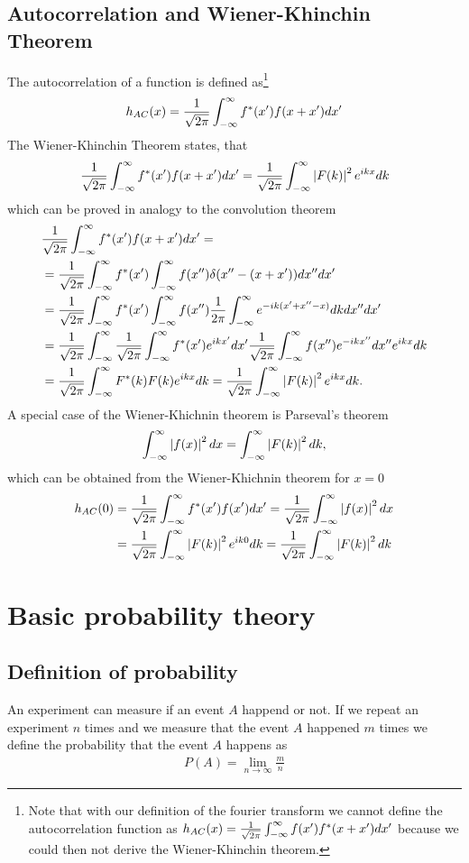 \subsection{Autocorrelation and Wiener-Khinchin Theorem}
The autocorrelation of a function is defined as\footnote{Note that
with our definition of the fourier transform we cannot define  
the autocorrelation function as $h_{AC}(x) = \frac{1}{\sqrt{2\pi}} \int_{-\infty}^{\infty} f(x') f^*(x+x') dx'$
because we could then not derive the Wiener-Khinchin theorem.}
\begin{align}
h_{AC}(x) = \frac{1}{\sqrt{2\pi}} \int_{-\infty}^{\infty} f^*(x') f(x+x') dx'
\end{align}
The Wiener-Khinchin Theorem states, that 
\begin{align}
\frac{1}{\sqrt{2\pi}} \int_{-\infty}^{\infty} f^*(x') f(x+x') dx' = \frac{1}{\sqrt{2\pi}} \int_{-\infty}^{\infty} \left\lvert F(k)\right\rvert^2 e^{ikx} dk
\end{align}
which can be proved in analogy to the convolution theorem
\begin{align*}
&\frac{1}{\sqrt{2\pi}} \int_{-\infty}^{\infty} f^*(x') f(x+x') dx' =\\
&=\frac{1}{\sqrt{2\pi}} \int_{-\infty}^{\infty} f^*(x') \int_{-\infty}^{\infty} f(x'') \delta(x''-(x+x')) dx'' dx'\\
&=\frac{1}{\sqrt{2\pi}} \int_{-\infty}^{\infty} f^*(x') \int_{-\infty}^{\infty} f(x'') \frac{1}{2\pi} \int_{-\infty}^{\infty} e^{-ik(x'+x''-x)} dk dx'' dx'\\
&=\frac{1}{\sqrt{2\pi}} \int_{-\infty}^{\infty} \frac{1}{\sqrt{2\pi}} \int_{-\infty}^{\infty} f^*(x') e^{ikx'} dx' \frac{1}{\sqrt{2\pi}} \int_{-\infty}^{\infty} f(x'') e^{-ikx''} dx''
e^{ikx} dk\\
&=\frac{1}{\sqrt{2\pi}} \int_{-\infty}^{\infty} F^*(k) F(k) e^{ikx} dk = \frac{1}{\sqrt{2\pi}} \int_{-\infty}^{\infty} \left\lvert F(k)\right\rvert^2 e^{ikx} dk.
\end{align*}
A special case of the Wiener-Khichnin theorem is Parseval's theorem
\begin{align}
\int_{-\infty}^{\infty} \left\lvert f(x)\right\rvert^2 dx = \int_{-\infty}^{\infty} \left\lvert F(k)\right\rvert^2 dk, 
\end{align}
which can be obtained from the Wiener-Khichnin theorem for $x=0$
\begin{align*}
h_{AC}(0)&= \frac{1}{\sqrt{2\pi}} \int_{-\infty}^{\infty} f^*(x') f(x') dx' = \frac{1}{\sqrt{2\pi}} \int_{-\infty}^{\infty} \left\lvert f(x)\right\rvert^2 dx \\
&= \frac{1}{\sqrt{2\pi}} \int_{-\infty}^{\infty} \left\lvert F(k)\right\rvert^2 e^{ik0} dk = \frac{1}{\sqrt{2\pi}} \int_{-\infty}^{\infty} \left\lvert F(k)\right\rvert^2 dk
\end{align*}

\section{Basic probability theory}

\subsection{Definition of probability}

An experiment can measure if an event $A$ happend or not. If we repeat
an experiment $n$ times and we measure that the event $A$ happened
$m$ times we define the probability that the event $A$ happens as
\begin{align}
P(A) = \lim\limits_{n \to \infty} \frac{m}{n}
\end{align}

